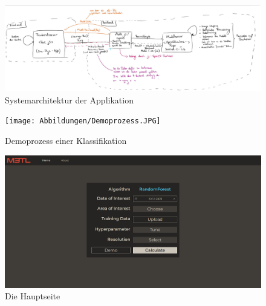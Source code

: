 


\begin{landscape}
    \thispagestyle{empty}
      \begin{figure}[H]
      \centering
      \includegraphics[scale=0.8]{Abbildungen/Serverarchitektur.JPG}
      \caption{Systemarchitektur der Applikation}
      \label{fig:systemarchitecture}
    \end{figure}
    \end{landscape}
    
    
    \begin{landscape}
    \thispagestyle{empty}
      \begin{figure}[H]
      \centering
      \texttt{[image: Abbildungen/Demoprozess.JPG]}
      \caption{Demoprozess einer Klassifikation}
      \label{fig:demoprocess}
    \end{figure}
    \end{landscape}
    
    \begin{landscape}
    \thispagestyle{empty}
        \begin{figure}[H]
        \centering
        \includegraphics[scale=0.5]{Abbildungen/web-home.png}
        \caption{Die Hauptseite}
        \label{fig:homepage}
    \end{figure}
    \end{landscape}
    
